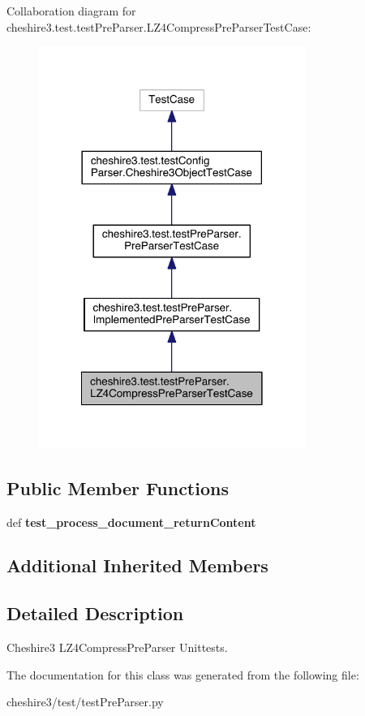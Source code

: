 Collaboration diagram for cheshire3.\-test.\-test\-Pre\-Parser.\-L\-Z4\-Compress\-Pre\-Parser\-Test\-Case\-:
\nopagebreak
\begin{figure}[H]
\begin{center}
\leavevmode
\includegraphics[width=246pt]{classcheshire3_1_1test_1_1test_pre_parser_1_1_l_z4_compress_pre_parser_test_case__coll__graph}
\end{center}
\end{figure}
\subsection*{Public Member Functions}
\begin{DoxyCompactItemize}
\item 
\hypertarget{classcheshire3_1_1test_1_1test_pre_parser_1_1_l_z4_compress_pre_parser_test_case_a39107547b69707d8ff6134209c9fb836}{def {\bfseries test\-\_\-process\-\_\-document\-\_\-return\-Content}}\label{classcheshire3_1_1test_1_1test_pre_parser_1_1_l_z4_compress_pre_parser_test_case_a39107547b69707d8ff6134209c9fb836}

\end{DoxyCompactItemize}
\subsection*{Additional Inherited Members}


\subsection{Detailed Description}
\begin{DoxyVerb}Cheshire3 LZ4CompressPreParser Unittests.\end{DoxyVerb}
 

The documentation for this class was generated from the following file\-:\begin{DoxyCompactItemize}
\item 
cheshire3/test/test\-Pre\-Parser.\-py\end{DoxyCompactItemize}
